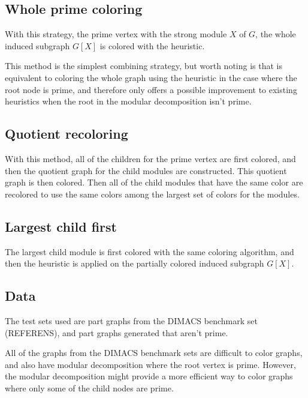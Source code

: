 \documentclass{amsart}
\begin{document}
\subsection{Whole prime coloring}

With this strategy, the prime vertex with the strong module $X$ of $G$, the
whole induced subgraph $G[X]$ is colored with the heuristic.

This method is the simplest combining strategy, but worth noting is that is
equivalent to coloring the whole graph using the heuristic in the case where the
root node is prime, and therefore only offers a possible improvement to existing
heuristics when the root in the modular decomposition isn't prime.

\subsection{Quotient recoloring}

With this method, all of the children for the prime vertex are first colored,
and then the quotient graph for the child modules are constructed. This quotient
graph is then colored. Then all of the child modules that have the same color
are recolored to use the same colors among the largest set of colors for the
modules.



\subsection{Largest child first}

The largest child module is first colored with the same coloring algorithm, and
then the heuristic is applied on the partially colored induced subgraph 
$G[X]$.


\subsection{Data}

The test sets used are part graphs from the DIMACS benchmark set (REFERENS), 
and part graphs generated that aren't prime.

All of the graphs from the DIMACS benchmark sets are difficult to color graphs,
and also have modular decomposition where the root vertex is prime. However, the
modular decomposition might provide a more efficient way to color graphs where
only some of the child nodes are prime. 
\end{document}
